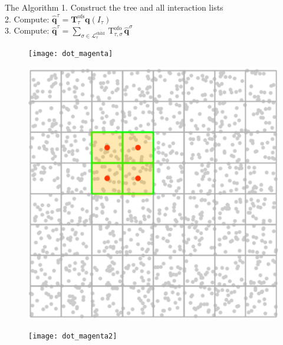  \begin{frame}{The Algorithm}
  1. Construct the tree and all interaction lists\\
  \vspace{3mm}
  2. Compute: $\hat{\mathbf{q}}^{\tau}=\mathbf{T}_{\tau}^{\mathrm{ofs}} \mathbf{q}\left(I_{\tau}\right)$\\
  \vspace{3mm}
  3. Compute: $\hat{\mathbf{q}}^{\tau}=\sum_{\sigma \in \mathcal{L}_{\tau}^{\text {child }}} \mathrm{T}_{\tau, \sigma}^{\text {ofo }} \hat{\mathbf{q}}^{\sigma}$\\

  \vspace{6mm}
  \begin{figure}[!tbp]
    \centering
    \begin{minipage}[b]{0.3\textwidth}
      \texttt{[image: dot\_magenta]}
    \end{minipage}
    \hfill
    \begin{minipage}[b]{0.3\textwidth}
      \includegraphics[width=\textwidth]{presentation/img/magenta_yeallow2.jpg}
    \end{minipage}
    \hfill
    \begin{minipage}[b]{0.3\textwidth}
      \texttt{[image: dot\_magenta2]}
    \end{minipage}
  \end{figure}

\end{frame}


